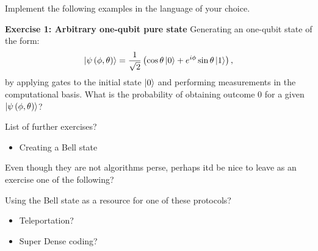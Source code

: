 Implement the following examples in the language of your choice.

\begin{tcolorbox}[standard jigsaw,
    opacityback=0,  %
    boxrule=0.5pt]
    {\bf Exercise 1:  Arbitrary one-qubit pure state}
    \tcbline
    Generating an one-qubit state of the form:
    \begin{align*}
    \left\vert{\psi\left(\phi,\theta\right)}\right\rangle=\frac{1}{\sqrt{2}}\left(\cos{\theta}\left\vert{0}\right\rangle+e^{i\phi}\sin{\theta}\left\vert{1}\right\rangle\right),
    \end{align*}
    by applying gates to the initial state $\left\vert{0}\right\rangle$ and performing measurements in the computational basis. What is the probability of obtaining outcome $0$ for a given $\left\vert{\psi\left(\phi,\theta\right)}\right\rangle$?
\end{tcolorbox}

List of further exercises?
\begin{itemize}
    \item Creating a Bell state
\end{itemize}

Even though they are not algorithms perse, perhaps itd be nice to leave as an exercise one of the following?

Using the Bell state as a resource for one of these protocols?
\begin{itemize}
    \item Teleportation?
    \item Super Dense coding?
\end{itemize}




